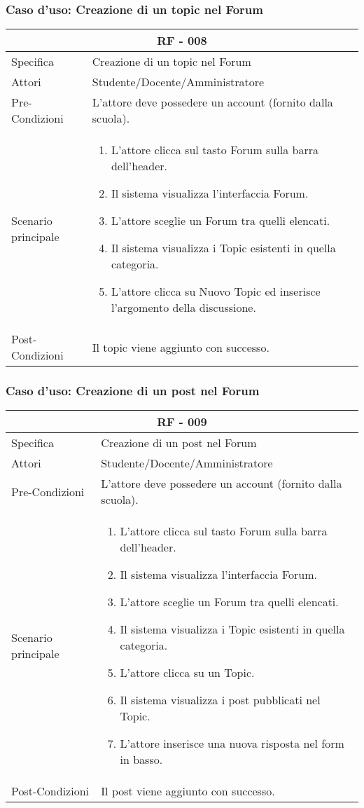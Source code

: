 \documentclass{article}
\begin{document}
\subsubsection{\textbf{Caso d'uso: Creazione di un topic nel Forum}}
\begin{tabular}{ |p{3cm}|p{9cm}|  }
	\hline
	\multicolumn{2}{|c|}{\textbf{RF - 008}} \\
	\hline
	Specifica& Creazione di un topic nel Forum\\
	\hline
	Attori& Studente/Docente/Amministratore\\
	\hline
	Pre-Condizioni& L'attore deve possedere un account (fornito dalla scuola).\\
	\hline
	Scenario principale& \begin{enumerate}
		\item L'attore clicca sul tasto Forum sulla barra dell'header.
		\item Il sistema visualizza l'interfaccia Forum.
		\item L'attore sceglie un Forum tra quelli elencati.
		\item Il sistema visualizza i Topic esistenti in quella categoria.
		\item L'attore clicca su Nuovo Topic ed inserisce l'argomento della discussione.
	\end{enumerate}\\
	\hline
	Post-Condizioni& Il topic viene aggiunto con successo.\\
	\hline
\end{tabular}
\subsubsection{\textbf{Caso d'uso: Creazione di un post nel Forum}}
\begin{tabular}{ |p{3cm}|p{9cm}|  }
	\hline
	\multicolumn{2}{|c|}{\textbf{RF - 009}} \\
	\hline
	Specifica& Creazione di un post nel Forum\\
	\hline
	Attori& Studente/Docente/Amministratore\\
	\hline
	Pre-Condizioni& L'attore deve possedere un account (fornito dalla scuola).\\
	\hline
	Scenario principale& \begin{enumerate}
		\item L'attore clicca sul tasto Forum sulla barra dell'header.
		\item Il sistema visualizza l'interfaccia Forum.
		\item L'attore sceglie un Forum tra quelli elencati.
		\item Il sistema visualizza i Topic esistenti in quella categoria.
		\item L'attore clicca su un Topic.
		\item Il sistema visualizza i post pubblicati nel Topic.
		\item L'attore inserisce una nuova risposta nel form in basso.
	\end{enumerate}\\
	\hline
	Post-Condizioni& Il post viene aggiunto con successo.\\
	\hline
\end{tabular}
\end{document}
